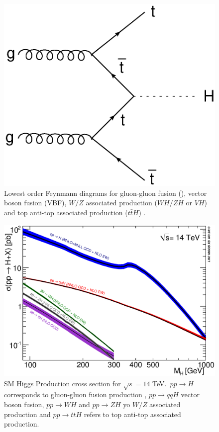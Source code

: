\begin{figure}[h]
\begin{minipage}[h]{0.4\linewidth}
					\end{minipage}
					\quad\quad
					\begin{minipage}[h]{0.4\linewidth}
						\includegraphics[width=1\linewidth]{T/FIGS/tth}
					\end{minipage}
				\caption[Feynmann diagrams of lowest order Higgs production processes]{Lowest order Feynmann diagrams for gluon-gluon fusion (\ggF), vector boson fusion (VBF), $W/Z$ associated production ($WH/ZH$ or $VH$) and top anti-top associated production ($t\bar{t}H$) \cite{higgsproduction}.}
				\label{fig:higgsproddiag}
			\end{figure}

			\begin{figure}[h]
				\centering
				\includegraphics[width=0.7\linewidth]{T/FIGS/YRHXS_Summary_fig3}
				\caption[Higgs production cross section as a function of Higgs mass at a $\sqrt{s}=14$TeV]{SM Higgs Production cross section for $\sqrt{s}=14$ TeV. $\,pp\rightarrow H$ corresponds to gluon-gluon fusion production , $pp\rightarrow qqH$ vector boson fusion, $pp\rightarrow WH$ and $pp\rightarrow ZH$ yo $W/Z$ associated production and  $pp\rightarrow ttH$ refers to top anti-top associated production.  \cite{LHCHiggsCS}}
				\label{fig:higgsproductionCS}
			\end{figure}


